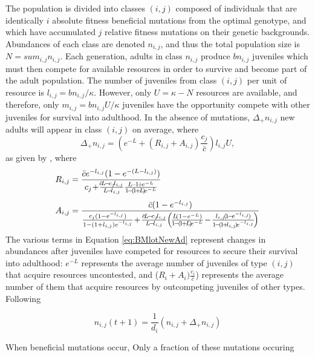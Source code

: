 \documentclass[9pt,twocolumn,twoside]{article}
\begin{document}
The population is divided into classes $(i,j)$ composed of individuals that are identically $i$ absolute fitness beneficial mutations from the optimal genotype, and which have accumulated $j$ relative fitness mutations on their genetic backgrounds. Abundances of each class are denoted $n_{i,j}$, and thus the total population size is $N=sum_{i,j} n_{i,j}$. Each generation, adults in class $n_{i,j}$ produce $b n_{i,j}$ juveniles which must then compete for available resources in order to survive and become part of the adult population. The number of juveniles from class $(i,j)$ per unit of resource is $l_{i,j} = b n_{i,j}/\kappa$. However, only $U=\kappa-N$ resources are available, and therefore, only $m_{i,j} = b n_{i,j} U/\kappa$ juveniles have the opportunity compete with other juveniles for survival into adulthood. In the absence of mutations, $\Delta_+ n_{i,j}$ new adults will appear in class $(i,j)$ on average, where
\begin{equation}\label{eq:BMlotNewAd}
    \Delta_{+}n_{i,j} = (e^{-L} +(R_{i,j}+A_{i,j})\frac{c_j}{\bar{c}})l_{i,j} U, 
\end{equation}
as given by \citet{bertram2019density}, where
\[
\begin{aligned}
R_{i,j} &= \frac{\bar{c}e^{-l_{i,j}}(1-e^{-(L-l_{i,j})})}{c_j\! +\!\frac{\!\bar{c}\!L\!-\!c_j\!l_{i,j}}{L\!-\!l_{i,j}}\frac{L\!-\!1\!+\!e^{-L}}{1\!-\!(\!1\!+\!L\!)\!e^{-L}}}\\[3pt]
A_{i,j} &= \frac{\bar{c}(1-e^{-l_{i,j}})}{ \footnotesize \frac{c_j(1-e^{-l_{i,j}})}{1-(1+l_{i,j})e^{-l_{i,j}}}\!+\!\frac{\bar{c}\!L\!-\!c_j\!l_{i,j}}{L\!-\!l_{i,j}}\!\left(\!\frac{L\!(1-e^{-L})}{1\!-\!(\!1\!+\!L\!)\!e^{-L}}\!-\!\frac{l_{i,j}\!(\!1\!-\!e^{-l_{i,j}}\!)}{1\!-\!(\!1\!+\!l_{i,j}\!)\!e^{-l_{i,j}}}\!\right)}\\
\end{aligned}
\]
The various terms in Equation \eqref{eq:BMlotNewAd} represent changes in abundances after juveniles have competed for resources to secure their survival into adulthood: $e^{-L}$ represents the average number of juveniles of type $(i,j)$ that acquire resources uncontested, and ($R_i+ A_i) \frac{c_i}{\bar{c}}$) represents the average number of them that acquire resources by outcompeting juveniles of other types. Following

\begin{equation}
    n_{i,j}(t+1) = \frac{1}{d_i}\left(n_{i,j} + \Delta_{+}n_{i,j}\right)
\end{equation}


When beneficial mutations occur, Only a fraction of these  mutations occuring
\end{document}

